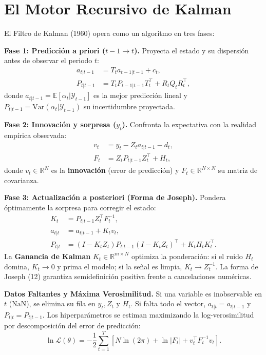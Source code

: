 \documentclass[10pt,twocolumn]{article}
\begin{document}
\section{El Motor Recursivo de Kalman}

El Filtro de Kalman (1960) opera como un algoritmo en tres fases:

\noindent\textbf{Fase 1: Predicción a priori ($t-1 \to t$).} Proyecta el estado y su dispersión antes de observar el periodo $t$:
\begin{align}
a_{t|t-1} &= T_t a_{t-1|t-1} + c_t, \tag{6} \\
P_{t|t-1} &= T_t P_{t-1|t-1} T_t^\top + R_t Q_t R_t^\top, \tag{7}
\end{align}
donde $a_{t|t-1} = \mathbb{E}[\alpha_t | \mathcal{Y}_{t-1}]$ es la mejor predicción lineal y $P_{t|t-1} = \text{Var}(\alpha_t | \mathcal{Y}_{t-1})$ su incertidumbre proyectada.

\noindent\textbf{Fase 2: Innovación y sorpresa ($y_t$).} Confronta la expectativa con la realidad empírica observada:
\begin{align}
v_t &= y_t - Z_t a_{t|t-1} - d_t, \tag{8} \\
F_t &= Z_t P_{t|t-1} Z_t^\top + H_t, \tag{9}
\end{align}
donde $v_t \in \mathbb{R}^N$ es la \textbf{innovación} (error de predicción) y $F_t \in \mathbb{R}^{N \times N}$ su matriz de covarianza.

\noindent\textbf{Fase 3: Actualización a posteriori (Forma de Joseph).} Pondera óptimamente la sorpresa para corregir el estado:
\begin{align}
K_t &= P_{t|t-1} Z_t^\top F_t^{-1}, \tag{10} \\
a_{t|t} &= a_{t|t-1} + K_t v_t, \tag{11} \\
P_{t|t} &= (I - K_t Z_t) P_{t|t-1} (I - K_t Z_t)^\top + K_t H_t K_t^\top. \tag{12}
\end{align}
La \textbf{Ganancia de Kalman} $K_t \in \mathbb{R}^{m \times N}$ optimiza la ponderación: si el ruido $H_t$ domina, $K_t \to 0$ y prima el modelo; si la señal es limpia, $K_t \to Z_t^{-1}$. La forma de Joseph (12) garantiza semidefinición positiva frente a cancelaciones numéricas.

\noindent\textbf{Datos Faltantes y Máxima Verosimilitud.} Si una variable es inobservable en $t$ ($\text{NaN}$), se elimina su fila en $y_t, Z_t$ y $H_t$. Si falta todo el vector, $a_{t|t} = a_{t|t-1}$ y $P_{t|t} = P_{t|t-1}$. Los hiperparámetros se estiman maximizando la log-verosimilitud por descomposición del error de predicción:
\begin{equation}
\ln \mathcal{L}(\theta) = -\frac{1}{2} \sum_{t=1}^T \left[ N \ln(2\pi) + \ln |F_t| + v_t^\top F_t^{-1} v_t \right]. \tag{13}
\end{equation}
\end{document}
